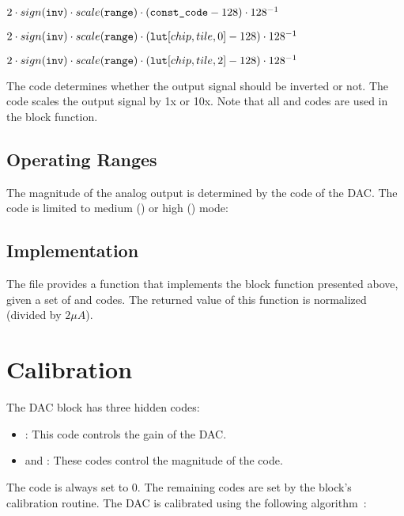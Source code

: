 \begin{algorithmic}

    \State $2 \cdot sign(\tx{inv}) \cdot scale(\tx{range}) \cdot (\tx{const_code}-128)\cdot 128^{-1}$

    \State $2 \cdot sign(\tx{inv}) \cdot scale(\tx{range}) \cdot (\tx{lut}\hslice{chip}{tile}{0}-128)\cdot 128^{-1}$

    \State $2 \cdot sign(\tx{inv}) \cdot scale(\tx{range}) \cdot (\tx{lut}\hslice{chip}{tile}{2}-128)\cdot 128^{-1}$
    \EndIf
 \EndIf
\end{algorithmic}

The  code determines whether the output signal should be inverted or
not. The  code scales the output signal by 1x or 10x. Note
that all \static and \dynamic codes are used in the block function.

\subsection{Operating Ranges}

The magnitude of the analog output is determined by the  code of the
DAC. The  code is limited to medium () or high
() mode:

\begin{algorithmic}
\end{algorithmic}

\subsection{\analoglib Implementation}
The  file provides a  function that implements the
block function presented above, given a set of \dynamic and \static codes. The
returned value of this function is normalized (divided by $2 \mu A$).

\section{Calibration}
The DAC block has three hidden codes:
\begin{itemize}
\item{}: This code controls the gain of the DAC.
\item{} and : These codes control the magnitude of the
   code.
\end{itemize}
The  code is always set to $0$. The remaining codes are set by the block's
calibration routine. The DAC is calibrated using the following
algorithm~\cite{dac_calib.cpp}:

